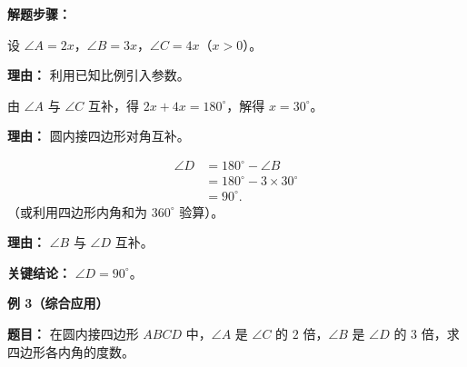 \begin{examplebox}
	\textbf{\textcolor{CExample}{解题步骤：}}
	\begin{description}[style=nextline, leftmargin=2.8em, labelsep=0.5em, itemsep=0.45em]
		\item[\textbf{第一步（设未知数）：}] 设 $\angle A=2x$，$\angle B=3x$，$\angle C=4x$（$x>0$）。
			\par\textbf{理由：} 利用已知比例引入参数。
		\item[\textbf{第二步（列互补方程）：}] 由 $\angle A$ 与 $\angle C$ 互补，得 $2x+4x=180^\circ$，解得 $x=30^\circ$。
			\par\textbf{理由：} 圆内接四边形对角互补。
		\item[\textbf{第三步（求 $\angle D$）：}]
			\[
				\begin{aligned}
					\angle D &= 180^\circ - \angle B \\
					&= 180^\circ - 3\times 30^\circ \\
					&= 90^\circ .
			\end{aligned}
			\]
			（或利用四边形内角和为 $360^\circ$ 验算）。
			\par\textbf{理由：} $\angle B$ 与 $\angle D$ 互补。
	\end{description}

	\textbf{\textcolor{CExample}{关键结论：}}
	$\angle D=90^\circ$。

	\medskip
	\textbf{\textcolor{CExample}{例 3（综合应用）}}

	\textbf{\textcolor{CExample}{题目：}}
	在圆内接四边形 $ABCD$ 中，$\angle A$ 是 $\angle C$ 的 $2$ 倍，$\angle B$ 是 $\angle D$ 的 $3$ 倍，求四边形各内角的度数。


\end{examplebox}
